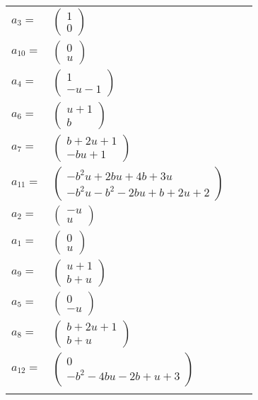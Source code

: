\documentclass[1p]{elsarticle_modified}
\theoremstyle{definition}
\begin{document}
\begin{tabular}{m{7pt} m{180pt} m{7pt} m{180pt} }
\flushright $a_{3}=$&$\begin{pmatrix}1\\0\end{pmatrix}$ \\
\flushright $a_{10}=$&$\begin{pmatrix}0\\u\end{pmatrix}$ \\
\flushright $a_{4}=$&$\begin{pmatrix}1\\- u-1\end{pmatrix}$ \\
\flushright $a_{6}=$&$\begin{pmatrix}u+1\\b\end{pmatrix}$ \\
\flushright $a_{7}=$&$\begin{pmatrix}b+2 u+1\\- b u+1\end{pmatrix}$ \\
\flushright $a_{11}=$&$\begin{pmatrix}- b^2 u+2 b u+4 b+3 u\\- b^2 u- b^2-2 b u+b+2 u+2\end{pmatrix}$ \\
\flushright $a_{2}=$&$\begin{pmatrix}- u\\u\end{pmatrix}$ \\
\flushright $a_{1}=$&$\begin{pmatrix}0\\u\end{pmatrix}$ \\
\flushright $a_{9}=$&$\begin{pmatrix}u+1\\b+u\end{pmatrix}$ \\
\flushright $a_{5}=$&$\begin{pmatrix}0\\- u\end{pmatrix}$ \\
\flushright $a_{8}=$&$\begin{pmatrix}b+2 u+1\\b+u\end{pmatrix}$ \\
\flushright $a_{12}=$&$\begin{pmatrix}0\\- b^2-4 b u-2 b+u+3\end{pmatrix}$\\&\end{tabular}
\end{document}
